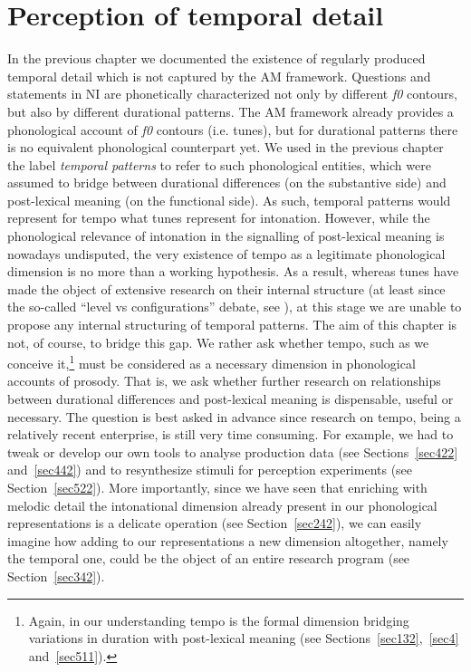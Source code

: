 \chapter[Perception of temporal detail]{Perception of temporal detail}\label{sec5}
In the previous chapter we documented the existence of regularly produced temporal detail which is not captured by the AM framework. Questions and statements in NI are phonetically characterized not only by different \textit{f0} contours, but also by different durational patterns. The AM framework already provides a phonological account of \textit{f0} contours (i.e. tunes), but for durational patterns there is no equivalent phonological counterpart yet. We used in the previous chapter the label \textit{temporal patterns} to refer to such phonological entities, which were assumed to bridge between durational differences (on the substantive side) and post-lexical meaning (on the functional side). As such, temporal patterns would represent for tempo what tunes represent for intonation. However, while the phonological relevance of intonation in the signalling of post-lexical meaning is nowadays undisputed, the very existence of tempo as a legitimate phonological dimension is no more than a working hypothesis. As a result, whereas tunes have made the object of extensive research on their internal structure (at least since the so-called ``level vs configurations'' debate, see \citealt[among others]{ladd2008intonational}), at this stage we are unable to propose any internal structuring of temporal patterns.
The aim of this chapter is not, of course, to bridge this gap. We rather ask whether tempo, such as we conceive it,\footnote{Again, in our understanding tempo is the formal dimension bridging variations in duration with post-lexical meaning (see Sections~\ref{sec132},~\ref{sec4} and~\ref{sec511}).} must be considered as a necessary dimension in phonological accounts of prosody. That is, we ask whether further research on relationships between durational differences and post-lexical meaning is dispensable, useful or necessary. The question is best asked in advance since research on tempo, being a relatively recent enterprise, is still very time consuming. For example, we had to tweak or develop our own tools to analyse production data (see Sections~\ref{sec422} and~\ref{sec442}) and to resynthesize stimuli for perception experiments (see Section~\ref{sec522}). More importantly, since we have seen that enriching with melodic detail the intonational dimension already present in our phonological representations is a delicate operation (see Section~\ref{sec242}), we can easily imagine how adding to our representations a new dimension altogether, namely the temporal one, could be the object of an entire research program (see Section~\ref{sec342}).
